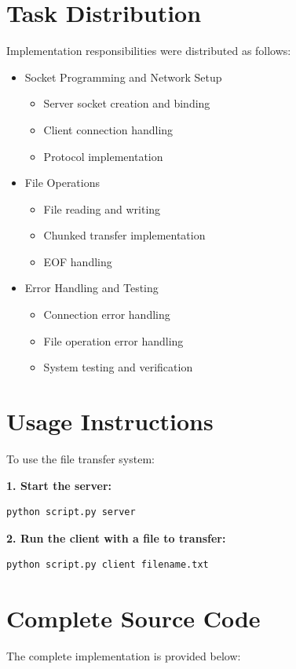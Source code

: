 \documentclass{article}
\begin{document}
\section{Task Distribution}
Implementation responsibilities were distributed as follows:
\begin{itemize}
    \item Socket Programming and Network Setup
    \begin{itemize}
        \item Server socket creation and binding
        \item Client connection handling
        \item Protocol implementation
    \end{itemize}
    \item File Operations
    \begin{itemize}
        \item File reading and writing
        \item Chunked transfer implementation
        \item EOF handling
    \end{itemize}
    \item Error Handling and Testing
    \begin{itemize}
        \item Connection error handling
        \item File operation error handling
        \item System testing and verification
    \end{itemize}
\end{itemize}

\section{Usage Instructions}
To use the file transfer system:

\textbf{1. Start the server:}
\begin{lstlisting}[language=Python]
python script.py server
\end{lstlisting}

\textbf{2. Run the client with a file to transfer:}
\begin{lstlisting}[language=Python]
python script.py client filename.txt
\end{lstlisting}

\appendix
\section{Complete Source Code}
The complete implementation is provided below:
\end{document}
